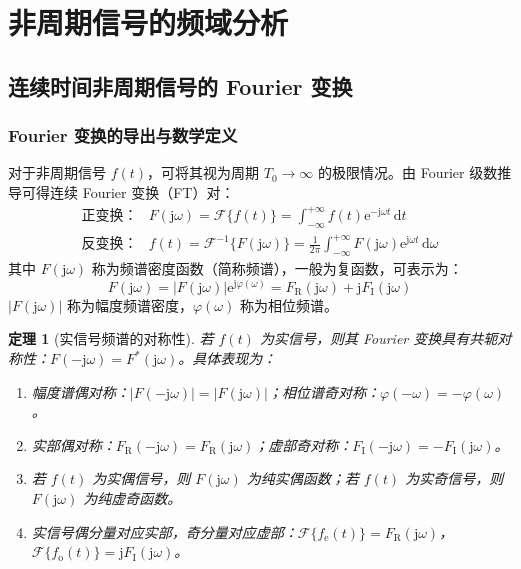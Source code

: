 \documentclass[11pt,a4paper,fontset=fandol]{ctexart}
\newtheorem{theorem}{定理}[section]
\theoremstyle{remark}
\begin{document}
\section{非周期信号的频域分析}

\subsection{连续时间非周期信号的 Fourier 变换}

\subsubsection{Fourier 变换的导出与数学定义}
对于非周期信号 $f(t)$，可将其视为周期 $T_0 \to \infty$ 的极限情况。由 Fourier 级数推导可得连续 Fourier 变换（FT）对：
\begin{align}
    \text{正变换}：& F(\mathrm{j}\omega) = \mathcal{F}\{f(t)\} = \int_{-\infty}^{+\infty} f(t)\mathrm{e}^{-\mathrm{j}\omega t}\,\mathrm{d}t \\
    \text{反变换}：& f(t) = \mathcal{F}^{-1}\{F(\mathrm{j}\omega)\} = \frac{1}{2\pi} \int_{-\infty}^{+\infty} F(\mathrm{j}\omega)\mathrm{e}^{\mathrm{j}\omega t}\,\mathrm{d}\omega
\end{align}
其中 $F(\mathrm{j}\omega)$ 称为频谱密度函数（简称频谱），一般为复函数，可表示为：
\begin{equation}
    F(\mathrm{j}\omega) = |F(\mathrm{j}\omega)|\mathrm{e}^{\mathrm{j}\varphi(\omega)} = F_{\mathrm{R}}(\mathrm{j}\omega) + \mathrm{j}F_{\mathrm{I}}(\mathrm{j}\omega)
\end{equation}
$|F(\mathrm{j}\omega)|$ 称为幅度频谱密度，$\varphi(\omega)$ 称为相位频谱。

\begin{theorem}[实信号频谱的对称性]
若 $f(t)$ 为实信号，则其 Fourier 变换具有共轭对称性：$F(-\mathrm{j}\omega) = F^*(\mathrm{j}\omega)$。具体表现为：
\begin{enumerate}
    \item 幅度谱偶对称：$|F(-\mathrm{j}\omega)| = |F(\mathrm{j}\omega)|$；相位谱奇对称：$\varphi(-\omega) = -\varphi(\omega)$。
    \item 实部偶对称：$F_{\mathrm{R}}(-\mathrm{j}\omega) = F_{\mathrm{R}}(\mathrm{j}\omega)$；虚部奇对称：$F_{\mathrm{I}}(-\mathrm{j}\omega) = -F_{\mathrm{I}}(\mathrm{j}\omega)$。
    \item 若 $f(t)$ 为实偶信号，则 $F(\mathrm{j}\omega)$ 为纯实偶函数；若 $f(t)$ 为实奇信号，则 $F(\mathrm{j}\omega)$ 为纯虚奇函数。
    \item 实信号偶分量对应实部，奇分量对应虚部：$\mathcal{F}\{f_{\mathrm{e}}(t)\} = F_{\mathrm{R}}(\mathrm{j}\omega)$，$\mathcal{F}\{f_{\mathrm{o}}(t)\} = \mathrm{j}F_{\mathrm{I}}(\mathrm{j}\omega)$。
\end{enumerate}
\end{theorem}
\end{document}
